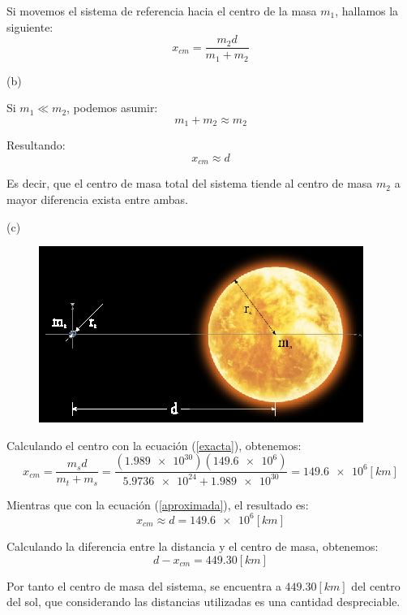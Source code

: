 \documentclass[letter,11pt]{article}
\begin{document}
Si movemos el sistema de referencia hacia el centro de la masa $m_1$,
hallamos la siguiente:
\begin{equation}
    x_{cm} = \frac{m_2 d}{m_1 + m_2}
\label{exacta}
\end{equation}

\vspace{0.5cm}
(b)

Si $m_1 \ll m_2$, podemos asumir:
\begin{equation*}
    m_1 + m_2 \approx m_2
\end{equation*}

Resultando:
\begin{equation}
    x_{cm} \approx d
\label{aproximada}
\end{equation}

Es decir, que el centro de masa total del sistema tiende al centro de masa $m_2$
a mayor diferencia exista entre ambas.

\vspace{0.5cm}
(c)

\begin{figure}[!h]
\centering
\includegraphics[scale=2.75]{resources/f2.eps}
\end{figure}

Calculando el centro con la ecuación (\ref{exacta}), obtenemos:
\begin{equation*}
    x_{cm} = \frac{m_s d}{m_t + m_s} = \frac{(\num{1.989e30}) (\num{149.6e6})}{\num{5.9736e24}+\num{1.989e30}} = \num{149.6e6} [km]
\end{equation*}

Mientras que con la ecuación (\ref{aproximada}), el resultado es:
\begin{equation*}
    x_{cm} \approx d = \num{149.6e6} [km]
\end{equation*}

Calculando la diferencia entre la distancia y el centro de masa, obtenemos:
\begin{equation}
    d - x_{cm} = 449.30 [km]
\end{equation}

Por tanto el centro de masa del sistema, se encuentra a $449.30 [km]$ del centro
del sol, que considerando las distancias utilizadas es una cantidad despreciable.
\end{document}
